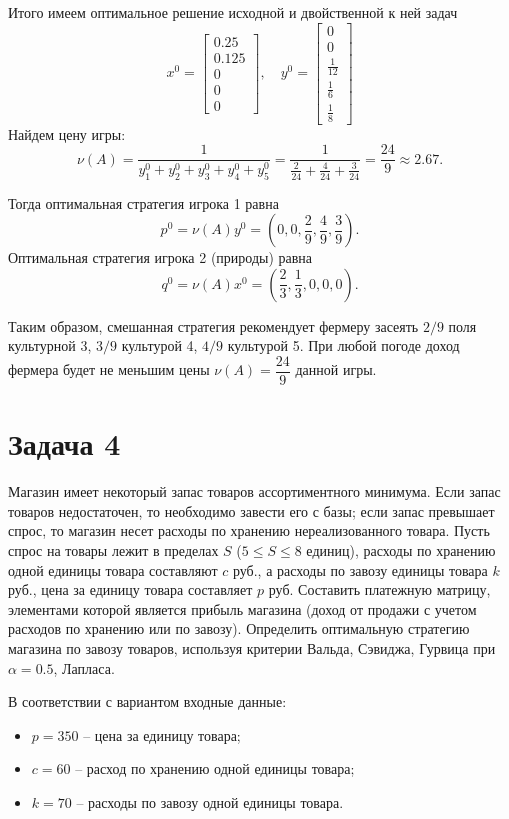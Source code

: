\documentclass[11pt]{article}
\begin{document}
    Итого имеем оптимальное решение исходной и двойственной к ней задач
\[x^0 = \begin{bmatrix} 0.25 \\ 0.125 \\ 0 \\ 0\\ 0\end{bmatrix},\quad y^0 = \begin{bmatrix} 0 \\ 0 \\ \frac{1}{12} \\ \frac{1}{6} \\ \frac{1}8\end{bmatrix}\]
Найдем цену игры:
\[\nu(A) = \dfrac{1}{y_1^0 + y_2^0 + y_3^0 + y_4^0 + y_5^0} = \dfrac{1}{\frac{2}{24} + \frac{4}{24} + \frac{3}{24}} = \dfrac{24}{9}\approx 2.67.\]

Тогда оптимальная стратегия игрока 1 равна
\[p^0 = \nu(A) y^0 = \left(0, 0, \dfrac29, \dfrac49, \dfrac39\right).\]
Оптимальная стратегия игрока 2 (природы) равна
\[q^0 = \nu(A) x^0 = \left(\dfrac23, \dfrac13, 0, 0, 0\right).\]

Таким образом, смешанная стратегия рекомендует фермеру засеять \(2/9\)
поля культурной 3, \(3/9\) культурой 4, \(4/9\) культурой 5. При любой
погоде доход фермера будет не меньшим цены \(\nu(A) = \dfrac{24}9\)
данной игры.

    \section{Задача 4}\label{ux437ux430ux434ux430ux447ux430-4}

    Магазин имеет некоторый запас товаров ассортиментного минимума. Если
запас товаров недостаточен, то необходимо завести его с базы; если запас
превышает спрос, то магазин несет расходы по хранению нереализованного
товара. Пусть спрос на товары лежит в пределах \(S\)
(\(5 \leq S \leq 8\) единиц), расходы по хранению одной единицы товара
составляют \(c\) руб., а расходы по завозу единицы товара \(k\) руб.,
цена за единицу товара составляет \(p\) руб. Составить платежную
матрицу, элементами которой является прибыль магазина (доход от продажи
с учетом расходов по хранению или по завозу). Определить оптимальную
стратегию магазина по завозу товаров, используя критерии Вальда,
Сэвиджа, Гурвица при \(\alpha = 0.5\), Лапласа.

В соответствии с вариантом входные данные:

\begin{itemize}
	\item \(p=350\) -- цена за
	единицу товара;
\item
  \(c=60\) -- расход по хранению одной единицы товара;
\item
  \(k=70\) -- расходы по завозу одной единицы товара.
\end{itemize}
\end{document}
